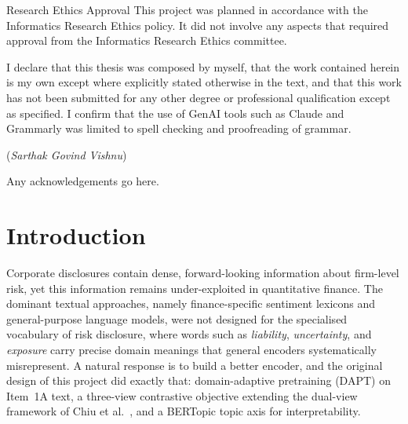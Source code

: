 \documentclass[logo,msc,ai]{infthesis}        %
\begin{document}
\begin{preliminary}
\maketitle

\newenvironment{ethics}
   {\begin{frontenv}{Research Ethics Approval}{\LARGE}}
   {\end{frontenv}\newpage}

\begin{ethics}
This project was planned in accordance with the Informatics Research Ethics policy. It
did not involve any aspects that required approval from the Informatics Research Ethics
committee.

\begin{declaration}
I declare that this thesis was composed by myself,
that the work contained herein is my own
except where explicitly stated otherwise in the text,
and that this work has not been submitted for any other degree or
professional qualification except as specified. I confirm that the use of GenAI tools
such as Claude and Grammarly was limited to spell checking and proofreading of
grammar.\par
\vspace{1in}\raggedleft({\em Sarthak Govind Vishnu\/})
\end{declaration}
\end{ethics}


\begin{acknowledgements}
Any acknowledgements go here.
\end{acknowledgements}


\tableofcontents
\end{preliminary}


\chapter{Introduction}

Corporate disclosures contain dense, forward-looking information about firm-level risk, yet this information remains under-exploited in quantitative finance. The dominant textual approaches, namely finance-specific sentiment lexicons \cite{loughran2011liability} and general-purpose language models, were not designed for the specialised vocabulary of risk disclosure, where words such as \textit{liability}, \textit{uncertainty}, and \textit{exposure} carry precise domain meanings that general encoders systematically misrepresent. A natural response is to build a better encoder, and the original design of this project did exactly that: domain-adaptive pretraining (DAPT) \cite{gururangan2020don} on Item~1A text, a three-view contrastive objective extending the dual-view framework of Chiu et al.\ \cite{chiu2025financial}, and a BERTopic topic axis \cite{grootendorst2022bertopic} for interpretability.
\end{document}
